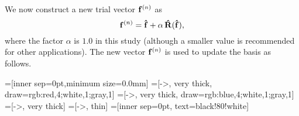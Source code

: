 \documentclass[reprint,superscriptaddress]{revtex4-1}
\begin{document}
We now construct a new trial vector $\mathbf{f}^{(n)}$ as
%
\begin{equation}
\mathbf{f}^{(n)}
=
\mathbf{\hat f}
+
\alpha \, \mathbf{\hat R}( \mathbf{\hat f} ),
\end{equation}
%
where the factor $\alpha$ is $1.0$ in this study
(although a smaller value is recommended
for other applications\cite{kovalenko1999, howard2011}).
%
The new vector $\mathbf{f}^{(n)}$
is used to update the basis as follows.





=[inner sep=0pt,minimum size=0.0mm]
=[->, very thick, draw={rgb:red,4;white,1;gray,1}]
=[->, very thick, draw={rgb:blue,4;white,1;gray,1}]
=[->, very thick]
=[->, thin]
=[inner sep=0pt, text=black!80!white]
\end{document}
